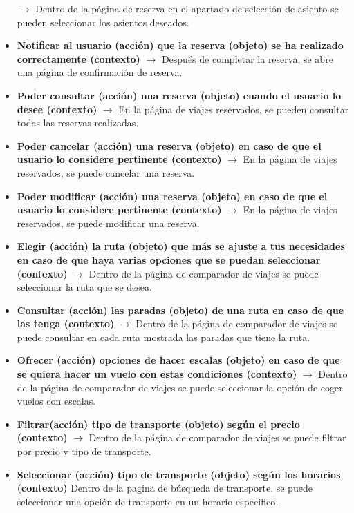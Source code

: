 \begin{itemize}
            $\rightarrow$ Dentro de la página de reserva en el apartado de selección de asiento se pueden seleccionar los asientos deseados.
      \item \textbf{Notificar al usuario (acción) que la reserva (objeto) se ha realizado correctamente (contexto)} $\rightarrow$ Después de completar la reserva,
            se abre una página de confirmación de reserva.
      \item \textbf{Poder consultar (acción) una reserva (objeto) cuando el usuario lo desee (contexto)} $\rightarrow$ En la página de viajes reservados, se pueden
            consultar todas las reservas realizadas.
      \item \textbf{Poder cancelar (acción) una reserva (objeto) en caso de que el usuario lo considere pertinente (contexto)} $\rightarrow$ En la página de viajes
            reservados, se puede cancelar una reserva.
      \item \textbf{Poder modificar (acción) una reserva (objeto) en caso de que el usuario lo considere pertinente (contexto)} $\rightarrow$ En la página de viajes
            reservados, se puede modificar una reserva.
      \item \textbf{Elegir (acción) la ruta (objeto) que más se ajuste a tus necesidades en caso de que haya varias opciones que se puedan seleccionar (contexto)}
            $\rightarrow$ Dentro de la página de comparador de viajes se puede seleccionar la ruta que se desea.
      \item \textbf{Consultar (acción) las paradas (objeto) de una ruta en caso de que las tenga (contexto)} $\rightarrow$ Dentro de la página de comparador de viajes
            se puede consultar en cada ruta mostrada las paradas que tiene la ruta.
      \item \textbf{Ofrecer (acción) opciones de hacer escalas (objeto) en caso de que se quiera hacer un vuelo con estas condiciones (contexto)} $\rightarrow$ Dentro
            de la página de comparador de viajes se puede seleccionar la opción de coger vuelos con escalas.
      \item \textbf{Filtrar(acción) tipo de transporte (objeto) según el precio (contexto)} $\rightarrow$ Dentro de la página de comparador de viajes se puede filtrar
            por precio y tipo de transporte.
      \item \textbf{Seleccionar (acción) tipo de transporte (objeto) según los horarios (contexto)} Dentro de la pagina de búsqueda de transporte, se puede seleccionar
            una opción de transporte en un horario específico.

\end{itemize}
